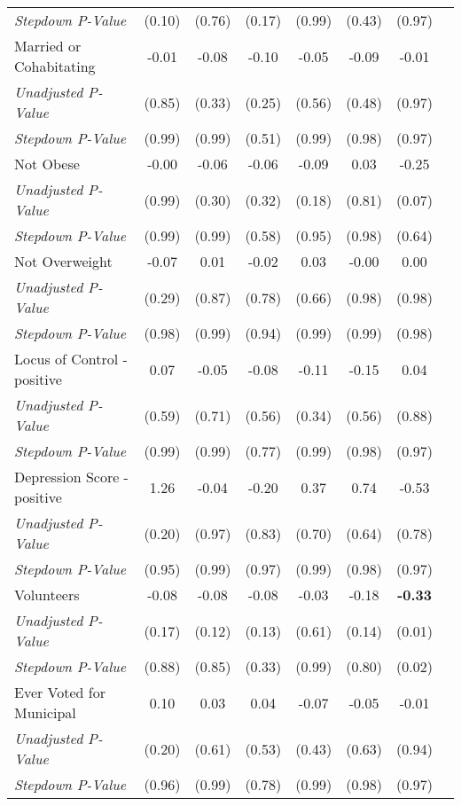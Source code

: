 \begin{tabular}{l c c c c c c c}
\quad \textit{Stepdown P-Value} & (0.10) & (0.76) & (0.17) & (0.99) & (0.43) & (0.97) \\
Married or Cohabitating & -0.01 & -0.08 & -0.10 & -0.05 & -0.09 & -0.01 \\
\quad \textit{Unadjusted P-Value} & (0.85) & (0.33) & (0.25) & (0.56) & (0.48) & (0.97) \\
\quad \textit{Stepdown P-Value} & (0.99) & (0.99) & (0.51) & (0.99) & (0.98) & (0.97) \\
Not Obese & -0.00 & -0.06 & -0.06 & -0.09 & 0.03 & -0.25 \\
\quad \textit{Unadjusted P-Value} & (0.99) & (0.30) & (0.32) & (0.18) & (0.81) & (0.07) \\
\quad \textit{Stepdown P-Value} & (0.99) & (0.99) & (0.58) & (0.95) & (0.98) & (0.64) \\
Not Overweight & -0.07 & 0.01 & -0.02 & 0.03 & -0.00 & 0.00 \\
\quad \textit{Unadjusted P-Value} & (0.29) & (0.87) & (0.78) & (0.66) & (0.98) & (0.98) \\
\quad \textit{Stepdown P-Value} & (0.98) & (0.99) & (0.94) & (0.99) & (0.99) & (0.98) \\
Locus of Control - positive & 0.07 & -0.05 & -0.08 & -0.11 & -0.15 & 0.04 \\
\quad \textit{Unadjusted P-Value} & (0.59) & (0.71) & (0.56) & (0.34) & (0.56) & (0.88) \\
\quad \textit{Stepdown P-Value} & (0.99) & (0.99) & (0.77) & (0.99) & (0.98) & (0.97) \\
Depression Score - positive & 1.26 & -0.04 & -0.20 & 0.37 & 0.74 & -0.53 \\
\quad \textit{Unadjusted P-Value} & (0.20) & (0.97) & (0.83) & (0.70) & (0.64) & (0.78) \\
\quad \textit{Stepdown P-Value} & (0.95) & (0.99) & (0.97) & (0.99) & (0.98) & (0.97) \\
Volunteers & -0.08 & -0.08 & -0.08 & -0.03 & -0.18 & \textbf{ -0.33 } \\
\quad \textit{Unadjusted P-Value} & (0.17) & (0.12) & (0.13) & (0.61) & (0.14) & (0.01) \\
\quad \textit{Stepdown P-Value} & (0.88) & (0.85) & (0.33) & (0.99) & (0.80) & (0.02) \\
Ever Voted for Municipal & 0.10 & 0.03 & 0.04 & -0.07 & -0.05 & -0.01 \\
\quad \textit{Unadjusted P-Value} & (0.20) & (0.61) & (0.53) & (0.43) & (0.63) & (0.94) \\
\quad \textit{Stepdown P-Value} & (0.96) & (0.99) & (0.78) & (0.99) & (0.98) & (0.97) \\

\end{tabular}
